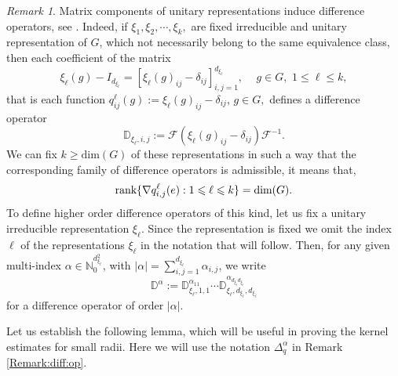 \documentclass[12pt, reqno]{amsart}
\theoremstyle{definition}
\theoremstyle{remark}
\newtheorem{remark}[theorem]{Remark}
\numberwithin{equation}{section}
\begin{document}
\begin{remark}\label{remarkD}
Matrix components of unitary representations induce difference operators, see \cite{22}. Indeed, if $\xi_{1},\xi_2,\cdots, \xi_{k},$ are  fixed irreducible and unitary  representation of $G$, which not necessarily belong to the same equivalence class, then each coefficient of the matrix
\begin{equation}
 \xi_{\ell}(g)-I_{d_{\xi_{\ell}}}=[\xi_{\ell}(g)_{ij}-\delta_{ij}]_{i,j=1}^{d_{\xi_\ell}},\, \quad g\in G, \,\,1\leq \ell\leq k,
\end{equation} 
that is each function 
$q^{\ell}_{ij}(g):=\xi_{\ell}(g)_{ij}-\delta_{ij}$, $ g\in G,$ defines a difference operator
\begin{equation}\label{Difference:op:rep}
    \mathbb{D}_{\xi_\ell,i,j}:=\mathscr{F}(\xi_{\ell}(g)_{ij}-\delta_{ij})\mathscr{F}^{-1}.
\end{equation}
We can fix $k\geq \mathrm{dim}(G)$ of these representations in such a way that the corresponding  family of difference operators is admissible, it  means that, 
\begin{equation*}
    \textnormal{rank}\{\nabla q^{\ell}_{i,j}(e):1\leqslant \ell\leqslant k \}=\textnormal{dim}(G).
\end{equation*}
To define higher order difference operators of this kind, let us fix a unitary irreducible representation $\xi_\ell$.
Since the representation is fixed we omit the index $\ell$ of the representations $\xi_\ell$ in the notation that will follow.
Then, for any given multi-index $\alpha\in \mathbb{N}_0^{d_{\xi_\ell}^2}$, with 
$|\alpha|=\sum_{i,j=1}^{d_{\xi_\ell}}\alpha_{i,j}$, we write
$$\mathbb{D}^{\alpha}:=\mathbb{D}_{\xi_{\ell},1,1}^{\alpha_{11}}\cdots \mathbb{D}^{\alpha_{d_{\xi_\ell}d_{\xi_\ell}}}_{\xi_\ell,d_{\xi_\ell},d_{\xi_\ell}}
$$ 
for a difference operator of order $|\alpha|$.
\end{remark}
 Let us establish the following lemma, which will be useful in proving the kernel estimates for small radii. Here we will use the notation $\Delta_q^\alpha$ in Remark \ref{Remark:diff:op}.
\end{document}
